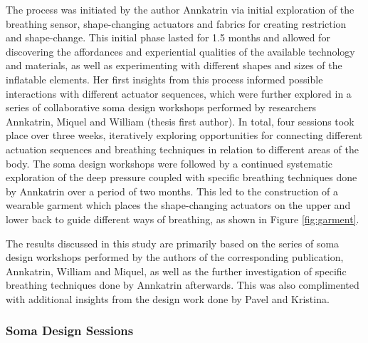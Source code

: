 The process was initiated by the author Annkatrin \cite{jung_exploring_2021} via initial exploration of the breathing sensor, shape-changing actuators and fabrics for creating restriction and shape-change. This initial phase lasted for 1.5 months and allowed for discovering the affordances and experiential qualities of the available technology and materials, as well as experimenting with different shapes and sizes of the inflatable elements. Her first insights from this process informed possible interactions with different actuator sequences, which were further explored in a series of collaborative soma design workshops \cite{hook_designing_2018} performed by researchers Annkatrin, Miquel and William (thesis first author).
In total, four sessions took place over three weeks, iteratively exploring opportunities for connecting different actuation sequences and breathing techniques in relation to different areas of the body. The soma design workshops were followed by a continued systematic exploration of the deep pressure coupled with specific breathing techniques done by Annkatrin over a period of two months. This led to the construction of a wearable garment which places the shape-changing actuators on the upper and lower back to guide different ways of breathing, as shown in Figure \ref{fig:garment}.


The results discussed in this study are primarily based on the series of soma design workshops performed by the authors of the corresponding publication, Annkatrin, William and Miquel, as well as the further investigation of specific breathing techniques done by Annkatrin afterwards. This was also complimented with additional insights from the design work done by Pavel and Kristina.

\subsubsection{Soma Design Sessions}
\label{sec:soma_workshops}

